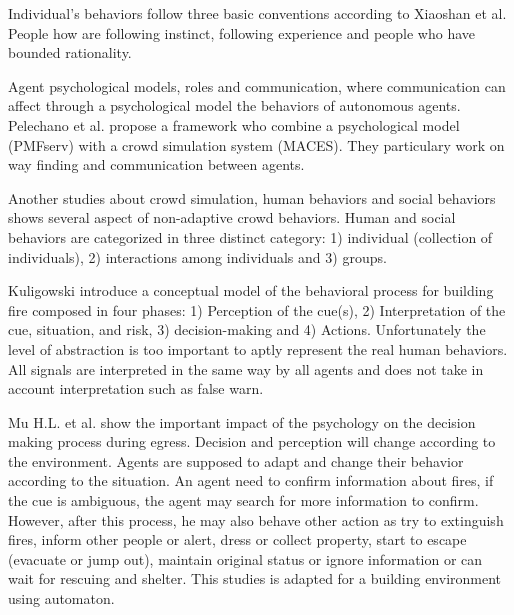             Individual's behaviors follow three basic conventions according to Xiaoshan et al. \cite{human2006} People how are following instinct, following experience and people who have bounded rationality.

            Agent psychological models, roles and communication, where communication can affect through a psychological model the behaviors of autonomous agents. Pelechano et al. propose a framework who combine a psychological model (PMFserv) with a crowd simulation system (MACES). They particulary work on way finding and communication between agents. \cite{crowd2005}

            Another studies about crowd simulation, human behaviors and social behaviors shows several aspect of non-adaptive crowd behaviors.
            Human and social behaviors are categorized in three distinct category: 1) individual (collection of individuals), 2) interactions among individuals and 3) groups. \cite{human2006}


            Kuligowski introduce a conceptual model of the behavioral process for building fire composed in four phases: 1) Perception of the cue(s), 2) Interpretation of the cue, situation, and risk, 3) decision-making and 4) Actions.
            Unfortunately the level of abstraction is too important to aptly represent the real human behaviors.
            All signals are interpreted in the same way by all agents and does not take in account interpretation such as false warn.\cite{modeling2008}
                

            Mu H.L. et al. show the important impact of the psychology on the decision making process during egress. 
            Decision and perception will change according to the environment. Agents are supposed to adapt and change their behavior according to the situation. \cite{pre-evaluation2013}
            An agent need to confirm information about fires, if the cue is ambiguous, the agent may search for more information to confirm. However, after this process, he may also behave other action as try to extinguish fires, inform other people or alert, dress or collect property, start to escape (evacuate or jump out), maintain original status or ignore information or can wait for rescuing and shelter. This studies is adapted for a building environment using automaton.


